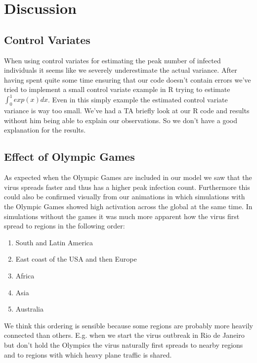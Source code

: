 
\section{Discussion}
\subsection{Control Variates}
When using control variates for estimating the peak number of infected individuals it seems like we severely underestimate the actual variance. After having spent quite some time ensuring that our code doesn't contain errors we've tried to implement a small control variate example in R trying to estimate $\int_0^1 exp(x) dx$. Even in this simply example the estimated control variate variance is way too small. We've had a TA briefly look at our R code and results without him being able to explain our observations. So we don't have a good explanation for the results.

\subsection{Effect of Olympic Games}
As expected when the Olympic Games are included in our model we saw that the virus spreads faster and thus has a higher peak infection count. Furthermore this could also be confirmed visually from our animations in which simulations with the Olympic Games showed high activation across the global at the same time. In simulations without the games it was much more apparent how the virus first spread to regions in the following order:
\begin{enumerate}
	\item South and Latin America
	\item  East coast of the USA and then Europe
	\item Africa
	\item Asia
	\item Australia
\end{enumerate}

We think this ordering is sensible because some regions are probably more heavily connected than others. E.g. when we start the virus outbreak in Rio de Janeiro but don't hold the Olympics the virus naturally  first spreads to nearby regions and to regions with which heavy plane traffic is shared.
